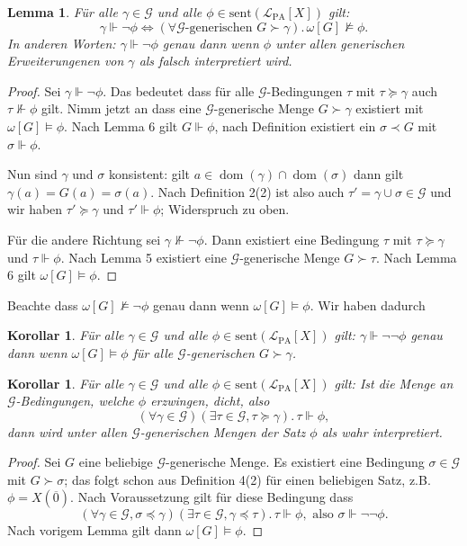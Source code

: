 \documentclass[nofonts]{uebung}
\newtheorem{lemma}[theorem]{Lemma}
\newtheorem{corollary}[theorem]{Korollar}
\DeclareMathOperator{\dom}{dom}
\begin{document}
\begin{lemma}
    Für alle $\gamma\in\mathcal G$ und alle $\phi\in \mathrm{sent}(\mathcal L_{\mathrm{PA}}[X])$ gilt:
    \[ \gamma\Vdash\neg\phi \iff (\forall\text{$\mathcal G$-generischen $G\succ\gamma$}).\, \omega[G]\not\vDash \phi. \]
    In anderen Worten: $\gamma\Vdash\neg\phi$ genau dann wenn $\phi$ unter allen generischen Erweiterungenen von $\gamma$ als falsch interpretiert wird.
\end{lemma}
\begin{proof}
    Sei $\gamma\Vdash\neg\phi$. Das bedeutet dass für alle $\mathcal G$-Bedingungen $\tau$ mit $\tau\succeq\gamma$ auch $\tau\not\Vdash \phi$ gilt.
    Nimm jetzt an dass eine $\mathcal G$-generische Menge $G\succ\gamma$ existiert mit $\omega[G]\vDash\phi$.
    Nach Lemma 6 gilt $G\Vdash\phi$, nach Definition existiert ein $\sigma\prec G$ mit $\sigma\Vdash\phi$.

    Nun sind $\gamma$ und $\sigma$ konsistent: gilt $a\in\dom(\gamma)\cap\dom(\sigma)$ dann gilt $\gamma(a)=G(a)=\sigma(a)$.
    Nach Definition 2(2) ist also auch $\tau'=\gamma\cup\sigma\in\mathcal G$ und wir haben $\tau'\succeq\gamma$ und $\tau'\Vdash\phi$; Widerspruch zu oben.

    Für die andere Richtung sei $\gamma\not\Vdash\neg\phi$. Dann existiert eine Bedingung $\tau$ mit $\tau\succeq\gamma$ und $\tau\Vdash\phi$.
    Nach Lemma 5 existiert eine $\mathcal G$-generische Menge $G\succ \tau$. Nach Lemma 6 gilt $\omega[G]\vDash\phi$.
\end{proof}

Beachte dass $\omega[G]\not\vDash\neg\phi$ genau dann wenn $\omega[G]\vDash\phi$. Wir haben dadurch
\begin{corollary}
    Für alle $\gamma\in\mathcal G$ und alle $\phi\in \mathrm{sent}(\mathcal L_{\mathrm{PA}}[X])$ gilt:
    $\gamma\Vdash\neg\neg\phi$ genau dann wenn $\omega[G]\vDash\phi$ für alle $\mathcal G$-generischen $G\succ\gamma$.
\end{corollary}
\begin{corollary}
    Für alle $\gamma\in\mathcal G$ und alle $\phi\in \mathrm{sent}(\mathcal L_{\mathrm{PA}}[X])$ gilt:
    Ist die Menge an $\mathcal G$-Bedingungen, welche $\phi$ erzwingen, dicht, also
    \[ (\forall \gamma\in\mathcal G)(\exists \tau\in\mathcal G, \tau\succeq\gamma).\,\tau\Vdash\phi, \]
    dann wird unter allen $\mathcal G$-generischen Mengen der Satz $\phi$ als wahr interpretiert.
\end{corollary}
\begin{proof}
    Sei $G$ eine beliebige $\mathcal G$-generische Menge.
    Es existiert eine Bedingung $\sigma\in\mathcal G$ mit $G\succ \sigma$; das folgt schon aus Definition 4(2) für einen beliebigen Satz, z.B. $\phi=X(\overline 0)$.
    Nach Voraussetzung gilt für diese Bedingung dass
    \[ (\forall\gamma\in\mathcal G, \sigma\preceq\gamma)(\exists \tau\in\mathcal G,\gamma\preceq\tau).\,\tau\Vdash\phi, \text{ also  } \sigma\Vdash\neg\neg\phi. \]
    Nach vorigem Lemma gilt dann $\omega[G]\vDash \phi$.
\end{proof}
\end{document}
